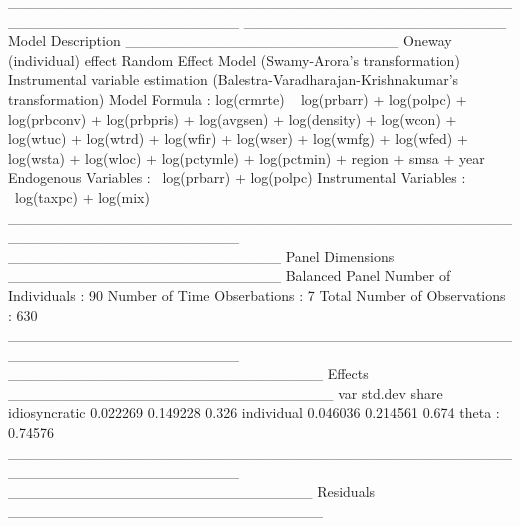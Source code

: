 \documentclass[a4paper]{article}
\begin{document}
\begin{Schunk}
\begin{Soutput}
______________________________________________________________________ 
_________________________ Model Description __________________________
Oneway (individual) effect
Random Effect Model (Swamy-Arora's transformation)
Instrumental variable estimation (Balestra-Varadharajan-Krishnakumar's transformation)
Model Formula             : log(crmrte) ~ log(prbarr) + log(polpc) + 
                                log(prbconv) + log(prbpris) + 
                                log(avgsen) + log(density) + 
                                log(wcon) + log(wtuc) + log(wtrd) + 
                                log(wfir) + log(wser) + log(wmfg) + 
                                log(wfed) + log(wsta) + log(wloc) + 
                                log(pctymle) + log(pctmin) + 
                                region + smsa + year
Endogenous Variables    : ~log(prbarr) + log(polpc)
Instrumental Variables    : ~log(taxpc) + log(mix)
______________________________________________________________________ 
__________________________ Panel Dimensions __________________________
Balanced Panel
Number of Individuals        :  90
Number of Time Obserbations  :  7
Total Number of Observations :  630
______________________________________________________________________ 
______________________________ Effects _______________________________
                   var  std.dev share
idiosyncratic 0.022269 0.149228 0.326
individual    0.046036 0.214561 0.674
theta   :  0.74576  
______________________________________________________________________ 
_____________________________ Residuals ______________________________

\end{Soutput}
\end{Schunk}
\end{document}
